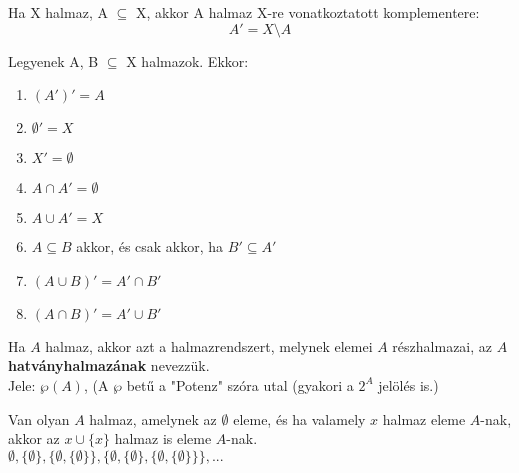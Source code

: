 \begin{frame}
  \begin{tcolorbox}[title={Definíció: Komplementer}]
    Ha X halmaz, A $\subseteq$ X, akkor A halmaz X-re vonatkoztatott komplementere:\\
    $$A' = X \setminus A$$
  \end{tcolorbox}

  \begin{tcolorbox}[title={Tétel: A komplementer tulajdonságai}]
    Legyenek A, B $\subseteq$ X halmazok. Ekkor:

    \begin{enumerate}
      \item $(A')' = A$
      \item $\emptyset' = X$
      \item $X' = \emptyset$
      \item $A \cap A' = \emptyset$
      \item $A \cup A' = X$
      \item $A \subseteq B$ akkor, és csak akkor, ha $B' \subseteq A'$      
      \item $(A \cup B)' = A' \cap B'$
      \item $(A \cap B)' = A' \cup B'$
    \end{enumerate}
  \end{tcolorbox}
\end{frame}

\begin{frame}
  \begin{tcolorbox}[title={Definíció: Hatványhalmaz}]
    Ha $A$ halmaz, akkor azt a halmazrendszert, melynek elemei $A$ részhalmazai, az \textbf{$A$ hatványhalmazának} nevezzük.\\
    Jele: ${\wp}(A)$, (A $\wp$ betű a "Potenz" szóra utal (gyakori a $2^A$ jelölés is.)
  \end{tcolorbox}

  \begin{tcolorbox}[title={Axióma: Végtelenségi Axióma}]
    Van olyan $A$ halmaz, amelynek az $\emptyset$ eleme, és ha valamely $x$ halmaz eleme $A$-nak, akkor az $x \cup \{ x \}$ halmaz is eleme $A$-nak.\\
    $\emptyset, \{ \emptyset \}, \{ \emptyset, \{ \emptyset \} \}, \{ \emptyset , \{ \emptyset \}, \{ \emptyset , \{ \emptyset \} \} \}, ...$
  \end{tcolorbox}
\end{frame}


